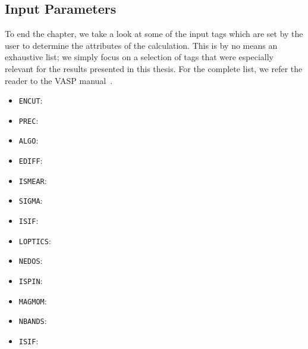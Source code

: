 \begin{refsection}
\section{Input Parameters} \label{sec:input}

To end the chapter, we take a look at some of the input tags which are set by the user to determine the attributes of the calculation. This is by no means an exhaustive list; we simply focus on a selection of tags that were especially relevant for the results presented in this thesis. For the complete list, we refer the reader to the VASP manual~\cite{vasp}.

\begin{itemize}

 \label{appendix:sec-ENCUT}
\item \texttt{ENCUT}: 

 \label{appendix:sec-PREC}
\item \texttt{PREC}: 

 \label{appendix:sec-ALGO}
\item \texttt{ALGO}: 

 \label{appendix:sec-EDIFF}
\item \texttt{EDIFF}: 

 \label{appendix:sec-ISMEAR}
\item \texttt{ISMEAR}: 

 \label{appendix:sec-SIGMA}
\item \texttt{SIGMA}: 

 \label{appendix:sec-ISIF}
\item \texttt{ISIF}: 

 \label{appendix:sec-LOPTICS}
\item \texttt{LOPTICS}: 

 \label{appendix:sec-NEDOS}
\item \texttt{NEDOS}: 

 \label{appendix:sec-ISPIN}
\item \texttt{ISPIN}: 

 \label{appendix:sec-MAGMOM}
\item \texttt{MAGMOM}: 

 \label{appendix:sec-NBANDS}
\item \texttt{NBANDS}: 

 \label{appendix:sec-ISIF}
\item \texttt{ISIF}: 


\end{itemize}
\end{refsection}
